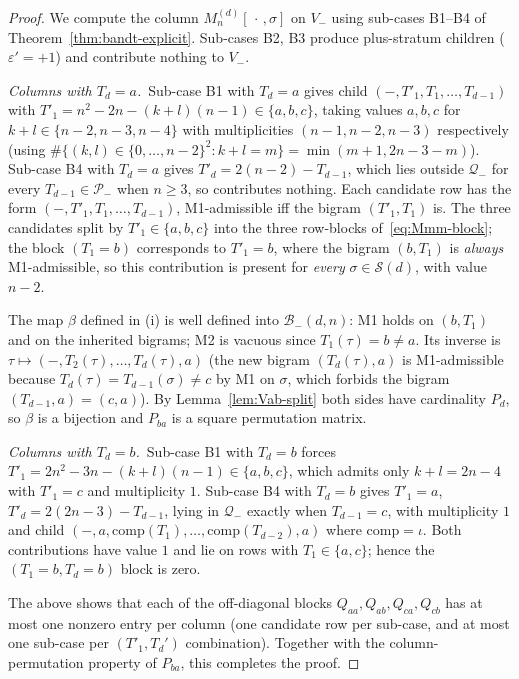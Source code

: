 \documentclass{amsart}
\theoremstyle{definition}
\theoremstyle{remark}
\begin{document}
\begin{proof}
We compute the column $M_n^{(d)}[\,\cdot\,, \sigma]$ on $V_-$
using sub-cases B1--B4 of Theorem~\ref{thm:bandt-explicit}.
Sub-cases B2, B3 produce plus-stratum children
($\varepsilon' = +1$) and contribute nothing to $V_-$.

\smallskip
\textit{Columns with $T_d = a$.}\ Sub-case B1 with $T_d = a$
gives child $(-, T'_1, T_1, \ldots, T_{d-1})$ with
$T'_1 = n^2 - 2n - (k+l)(n-1) \in \{a, b, c\}$, taking values
$a, b, c$ for $k + l \in \{n-2, n-3, n-4\}$ with multiplicities
$(n-1, n-2, n-3)$ respectively (using
$\#\{(k, l) \in \{0, \ldots, n-2\}^2 : k + l = m\} =
\min(m+1, 2n-3-m)$).  Sub-case B4 with $T_d = a$ gives
$T'_d = 2(n-2) - T_{d-1}$, which lies outside $\mathcal{Q}_-$
for every $T_{d-1} \in \mathcal{P}_-$ when $n \ge 3$, so
contributes nothing.  Each candidate row has the form
$(-, T'_1, T_1, \ldots, T_{d-1})$, M1-admissible iff the bigram
$(T'_1, T_1)$ is.  The three candidates split by $T'_1 \in
\{a, b, c\}$ into the three row-blocks of~\eqref{eq:Mmm-block};
the block $(T_1 = b)$ corresponds to $T'_1 = b$, where the
bigram $(b, T_1)$ is \emph{always} M1-admissible, so this
contribution is present for \emph{every} $\sigma \in
\mathcal{S}(d)$, with value $n - 2$.

The map $\beta$ defined in (i) is well defined into
$\mathcal{B}_-(d, n)$: M1 holds on $(b, T_1)$ and on the
inherited bigrams; M2 is vacuous since $T_1(\tau) = b \neq a$.
Its inverse is $\tau \mapsto (-, T_2(\tau), \ldots, T_d(\tau), a)$
(the new bigram $(T_d(\tau), a)$ is M1-admissible because
$T_d(\tau) = T_{d-1}(\sigma) \neq c$ by M1 on $\sigma$, which
forbids the bigram $(T_{d-1}, a) = (c, a)$).
By Lemma~\ref{lem:Vab-split} both sides have cardinality $P_d$,
so $\beta$ is a bijection and $P_{ba}$ is a square permutation
matrix.

\smallskip
\textit{Columns with $T_d = b$.}\ Sub-case B1 with $T_d = b$
forces $T'_1 = 2n^2 - 3n - (k+l)(n-1) \in \{a, b, c\}$, which
admits only $k + l = 2n - 4$ with $T'_1 = c$ and multiplicity
$1$.  Sub-case B4 with $T_d = b$ gives $T'_1 = a$,
$T'_d = 2(2n-3) - T_{d-1}$, lying in $\mathcal{Q}_-$ exactly
when $T_{d-1} = c$, with multiplicity $1$ and child
$(-, a, \mathrm{comp}(T_1), \ldots, \mathrm{comp}(T_{d-2}), a)$
where $\mathrm{comp} = \iota$.  Both contributions have value
$1$ and lie on rows with $T_1 \in \{a, c\}$; hence the
$(T_1 = b, T_d = b)$ block is zero.

\smallskip
The above shows that each of the off-diagonal blocks
$Q_{aa}, Q_{ab}, Q_{ca}, Q_{cb}$ has at most one nonzero entry
per column (one candidate row per sub-case, and at most one
sub-case per $(T'_1, T_d')$ combination).  Together with the
column-permutation property of $P_{ba}$, this completes the
proof.
\end{proof}
\end{document}
